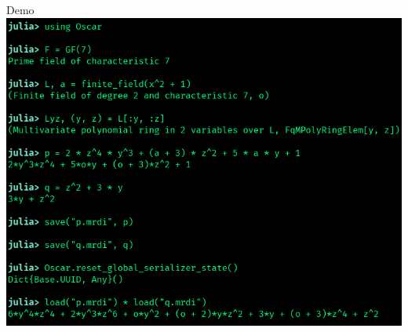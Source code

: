 \documentclass[9pt]{beamer}
\theoremstyle{definition}
\begin{document}
\begin{frame}[fragile]{ Demo}
  \includegraphics[height=0.8\textheight]{images/demo}
\end{frame}

\end{document}
